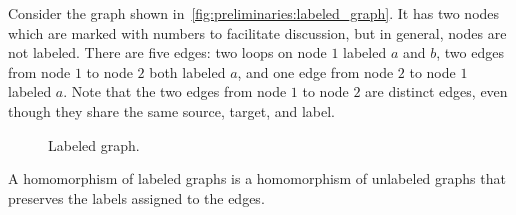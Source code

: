 \begin{example}
    Consider the graph shown in~\autoref{fig:preliminaries:labeled_graph}.
    It has two nodes which are marked with numbers to facilitate discussion, but in general, nodes are not labeled.
    There are five edges: two loops on node $1$ labeled \(a\) and \(b\), two edges from node $1$ to node $2$ both labeled \(a\), and one edge from node $2$ to node $1$ labeled \(a\). Note that the two edges from node $1$ to node $2$ are distinct edges, even though they share the same source, target, and label.

    \begin{figure}[H]
       \centering
        \caption{Labeled graph.}
        \label{fig:preliminaries:labeled_graph}
    \end{figure}

\end{example}
  A homomorphism of labeled graphs is a homomorphism of unlabeled graphs that preserves the labels assigned to the edges. 